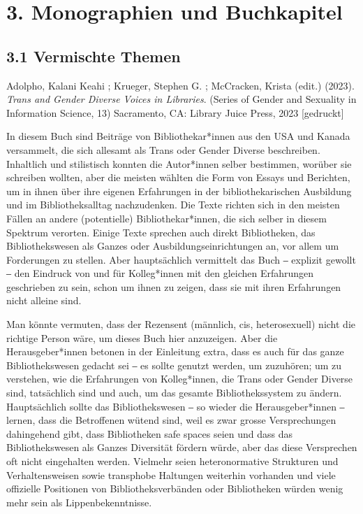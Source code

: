 \documentclass[a4paper,
fontsize=11pt,
oneside,
numbers=noperiodatend,
parskip=half-,
bibliography=totoc,
final
]{scrartcl}
\begin{document}
\hypertarget{monographien-und-buchkapitel}{%
\section{3. Monographien und
Buchkapitel}\label{monographien-und-buchkapitel}}

\hypertarget{vermischte-themen-1}{%
\subsection{3.1 Vermischte Themen}\label{vermischte-themen-1}}

Adolpho, Kalani Keahi ; Krueger, Stephen G. ; McCracken, Krista (edit.)
(2023). \emph{Trans and Gender Diverse Voices in Libraries}. (Series of
Gender and Sexuality in Information Science, 13) Sacramento, CA: Library
Juice Press, 2023 {[}gedruckt{]}

In diesem Buch sind Beiträge von Bibliothekar*innen aus den USA und
Kanada versammelt, die sich allesamt als Trans oder Gender Diverse
beschreiben. Inhaltlich und stilistisch konnten die Autor*innen selber
bestimmen, worüber sie schreiben wollten, aber die meisten wählten die
Form von Essays und Berichten, um in ihnen über ihre eigenen Erfahrungen
in der bibliothekarischen Ausbildung und im Bibliotheksalltag
nachzudenken. Die Texte richten sich in den meisten Fällen an andere
(potentielle) Bibliothekar*innen, die sich selber in diesem Spektrum
verorten. Einige Texte sprechen auch direkt Bibliotheken, das
Bibliothekswesen als Ganzes oder Ausbildungseinrichtungen an, vor allem
um Forderungen zu stellen. Aber hauptsächlich vermittelt das Buch ‒
explizit gewollt ‒ den Eindruck von und für Kolleg*innen mit den
gleichen Erfahrungen geschrieben zu sein, schon um ihnen zu zeigen, dass
sie mit ihren Erfahrungen nicht alleine sind.

Man könnte vermuten, dass der Rezensent (männlich, cis, heterosexuell)
nicht die richtige Person wäre, um dieses Buch hier anzuzeigen. Aber die
Herausgeber*innen betonen in der Einleitung extra, dass es auch für das
ganze Bibliothekswesen gedacht sei ‒ es sollte genutzt werden, um
zuzuhören; um zu verstehen, wie die Erfahrungen von Kolleg*innen, die
Trans oder Gender Diverse sind, tatsächlich sind und auch, um das
gesamte Bibliothekssystem zu ändern. Hauptsächlich sollte das
Bibliothekswesen ‒ so wieder die Herausgeber*innen ‒ lernen, dass die
Betroffenen wütend sind, weil es zwar grosse Versprechungen dahingehend
gibt, dass Bibliotheken safe spaces seien und dass das Bibliothekswesen
als Ganzes Diversität fördern würde, aber das diese Versprechen oft
nicht eingehalten werden. Vielmehr seien heteronormative Strukturen und
Verhaltensweisen sowie transphobe Haltungen weiterhin vorhanden und
viele offizielle Positionen von Bibliotheksverbänden oder Bibliotheken
würden wenig mehr sein als Lippenbekenntnisse.
\end{document}
